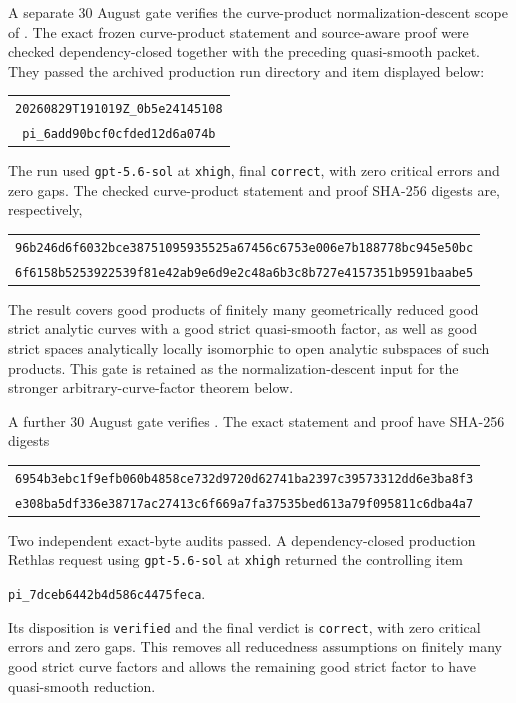 A separate 30 August gate verifies the curve-product normalization-descent
scope of
.
The exact frozen curve-product statement and source-aware proof were checked
dependency-closed together with the preceding quasi-smooth packet.  They
passed the archived production run directory and item displayed below:
\begin{center}
\small
\begin{tabular}{@{}c@{}}
\nolinkurl{20260829T191019Z_0b5e24145108}\\
\nolinkurl{pi_6add90bcf0cfded12d6a074b}
\end{tabular}
\end{center}
The run used \texttt{gpt-5.6-sol} at \texttt{xhigh}, final
\texttt{correct}, with zero
critical errors and zero gaps.  The checked curve-product statement and proof
SHA-256 digests are, respectively,
\begin{center}
\small
\begin{tabular}{@{}c@{}}
\nolinkurl{96b246d6f6032bce38751095935525a67456c6753e006e7b188778bc945e50bc}\\
\nolinkurl{6f6158b5253922539f81e42ab9e6d9e2c48a6b3c8b727e4157351b9591baabe5}
\end{tabular}
\end{center}
The result covers good products of finitely many geometrically reduced good
strict analytic curves with a good strict quasi-smooth factor, as well as good
strict spaces analytically locally isomorphic to open analytic subspaces of
such products.  This gate is retained as the normalization-descent input for
the stronger arbitrary-curve-factor theorem below.

A further 30 August gate verifies
.  The exact statement and proof have
SHA-256 digests
\begin{center}
\small
\begin{tabular}{@{}c@{}}
\nolinkurl{6954b3ebc1f9efb060b4858ce732d9720d62741ba2397c39573312dd6e3ba8f3}\\
\nolinkurl{e308ba5df336e38717ac27413c6f669a7fa37535bed613a79f095811c6dba4a7}
\end{tabular}
\end{center}
Two independent exact-byte audits passed.  A dependency-closed production
Rethlas request using \texttt{gpt-5.6-sol} at \texttt{xhigh} returned the
controlling item
\begin{center}
\small
\nolinkurl{pi_7dceb6442b4d586c4475feca}.
\end{center}
Its disposition is \texttt{verified} and the final verdict is
\texttt{correct}, with zero critical errors and zero gaps.  This removes all
reducedness assumptions on finitely many good strict curve factors and
allows the remaining good strict factor to have quasi-smooth reduction.

